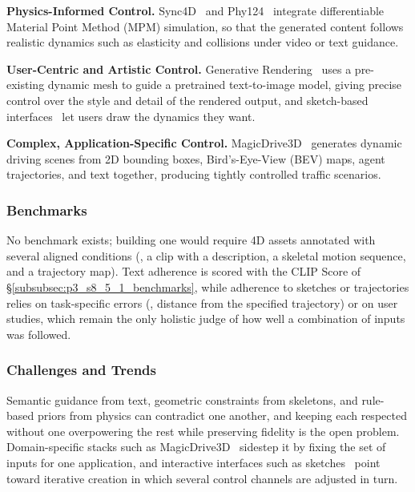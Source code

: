 \textbf{Physics-Informed Control.} Sync4D~\cite{fu2024sync4d} and Phy124~\cite{lin2024phy124} integrate differentiable Material Point Method (MPM) simulation, so that the generated content follows realistic dynamics such as elasticity and collisions under video or text guidance.

\textbf{User-Centric and Artistic Control.} Generative Rendering~\cite{cai2024generative} uses a pre-existing dynamic mesh to guide a pretrained text-to-image model, giving precise control over the style and detail of the rendered output, and sketch-based interfaces~\cite{yang2024sketch} let users draw the dynamics they want.

\textbf{Complex, Application-Specific Control.} MagicDrive3D~\cite{gao2024magicdrive3d} generates dynamic driving scenes from 2D bounding boxes, Bird's-Eye-View (BEV) maps, agent trajectories, and text together, producing tightly controlled traffic scenarios.


\subsubsection{Benchmarks}
\label{subsubsec:p3_s8_5_5_benchmarks}
No benchmark exists; building one would require 4D assets annotated with several aligned conditions (\eg, a clip with a description, a skeletal motion sequence, and a trajectory map). Text adherence is scored with the CLIP Score of §\ref{subsubsec:p3_s8_5_1_benchmarks}, while adherence to sketches or trajectories relies on task-specific errors (\eg, distance from the specified trajectory) or on user studies, which remain the only holistic judge of how well a combination of inputs was followed.

\subsubsection{Challenges and Trends}
\label{subsubsec:p3_s8_5_5_challenges}
Semantic guidance from text, geometric constraints from skeletons, and rule-based priors from physics can contradict one another, and keeping each respected without one overpowering the rest while preserving fidelity is the open problem.
Domain-specific stacks such as MagicDrive3D~\cite{gao2024magicdrive3d} sidestep it by fixing the set of inputs for one application, and interactive interfaces such as sketches~\cite{yang2024sketch} point toward iterative creation in which several control channels are adjusted in turn.



